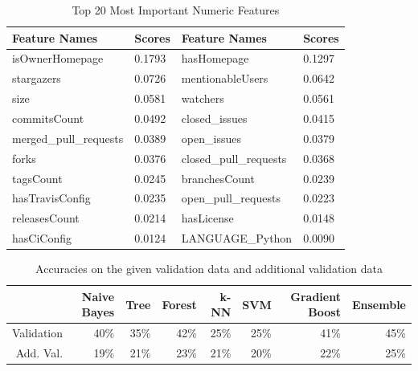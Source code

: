 \begin{table}[h]
	\centering
	\caption{Top 20 Most Important Numeric Features}
	\label{feature_importance_numeric}
	\begin{tabular}{|l|l|l|l|}
	\hline
		Feature Names & Scores & Feature Names & Scores \\ \hline
		isOwnerHomepage  &   0.1793 & hasHomepage & 0.1297 \\ \hline
		stargazers  &   0.0726 & mentionableUsers & 0.0642 \\ \hline
		size  &   0.0581 & watchers & 0.0561 \\ \hline
		commitsCount  &   0.0492 & closed\_issues & 0.0415 \\ \hline
		merged\_pull\_requests  &   0.0389 & open\_issues & 0.0379 \\ \hline
		forks  &   0.0376 & closed\_pull\_requests & 0.0368 \\ \hline
		tagsCount  &   0.0245 & branchesCount & 0.0239 \\ \hline
		hasTravisConfig  &   0.0235 & open\_pull\_requests & 0.0223 \\ \hline
		releasesCount  &   0.0214 & hasLicense & 0.0148 \\ \hline
		hasCiConfig  &   0.0124 & LANGUAGE\_Python & 0.0090 \\ \hline
	\end{tabular}
\end{table}

\begin{table}[h]
	\label{benchmark_numeric}
	\centering
	\caption{Accuracies on the given validation data and additional validation data}
	\begin{tabular}{|r|r|r|r|r|r|r|r|}
	\hline
	          & Naive Bayes & Tree & Forest & k-NN & SVM & Gradient Boost & Ensemble \\ \hline
	Validation& 40\%        & 35\%          & 42\%          & 25\% & 25\% & 41\% & 45\%         \\ \hline
	Add. Val. & 19\%        & 21\%          & 23\%          & 21\% & 20\% & 22\% & 25\%         \\ \hline
	\end{tabular}
\end{table}
